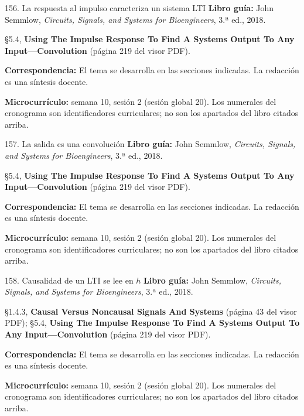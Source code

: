 \documentclass[
  10pt,
  ignorenonframetext,
  aspectratio=169,
  spanish,
]{beamer}
\begin{document}
\begin{frame}{156. La respuesta al impulso caracteriza un sistema LTI}
\label{la-respuesta-al-impulso-caracteriza-un-sistema-lti}
\textbf{Libro guía:} John Semmlow, \emph{Circuits, Signals, and Systems
for Bioengineers}, 3.ª ed., 2018.

§5.4, \textbf{Using The Impulse Response To Find A Systems Output To Any
Input---Convolution} (página 219 del visor PDF).

\textbf{Correspondencia:} El tema se desarrolla en las secciones
indicadas. La redacción es una síntesis docente.

\textbf{Microcurrículo:} semana 10, sesión 2 (sesión global 20). Los
numerales del cronograma son identificadores curriculares; no son los
apartados del libro citados arriba.
\end{frame}

\begin{frame}{157. La salida es una convolución}
\label{la-salida-es-una-convoluciuxf3n}
\textbf{Libro guía:} John Semmlow, \emph{Circuits, Signals, and Systems
for Bioengineers}, 3.ª ed., 2018.

§5.4, \textbf{Using The Impulse Response To Find A Systems Output To Any
Input---Convolution} (página 219 del visor PDF).

\textbf{Correspondencia:} El tema se desarrolla en las secciones
indicadas. La redacción es una síntesis docente.

\textbf{Microcurrículo:} semana 10, sesión 2 (sesión global 20). Los
numerales del cronograma son identificadores curriculares; no son los
apartados del libro citados arriba.
\end{frame}

\begin{frame}{158. Causalidad de un LTI se lee en \(h\)}
\label{causalidad-de-un-lti-se-lee-en-h}
\textbf{Libro guía:} John Semmlow, \emph{Circuits, Signals, and Systems
for Bioengineers}, 3.ª ed., 2018.

§1.4.3, \textbf{Causal Versus Noncausal Signals And Systems} (página 43
del visor PDF); §5.4, \textbf{Using The Impulse Response To Find A
Systems Output To Any Input---Convolution} (página 219 del visor PDF).

\textbf{Correspondencia:} El tema se desarrolla en las secciones
indicadas. La redacción es una síntesis docente.

\textbf{Microcurrículo:} semana 10, sesión 2 (sesión global 20). Los
numerales del cronograma son identificadores curriculares; no son los
apartados del libro citados arriba.
\end{frame}
\end{document}
